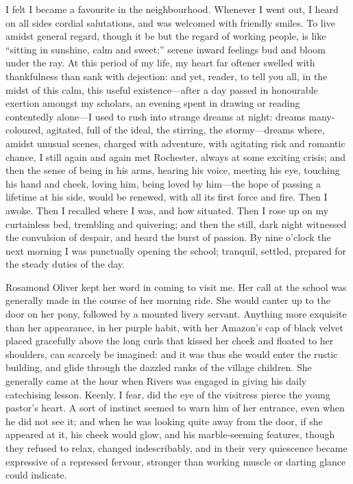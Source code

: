 I felt I became a favourite in the neighbourhood. Whenever I went out,
I heard on all sides cordial salutations, and was welcomed with friendly
smiles. To live amidst general regard, though it be but the regard of
working people, is like \enquote{sitting in sunshine, calm and sweet;}
serene inward feelings bud and bloom under the ray. At this period of
my life, my heart far oftener swelled with thankfulness than sank with
dejection: and yet, reader, to tell you all, in the midst of this calm,
this useful existence---after a day passed in honourable exertion
amongst my scholars, an evening spent in drawing or reading contentedly
alone---I used to rush into strange dreams at night: dreams
many-coloured, agitated, full of the ideal, the stirring, the
stormy---dreams where, amidst unusual scenes, charged with adventure,
with agitating risk and romantic chance, I still again and again met \Mr{}
Rochester, always at some exciting crisis; and then the sense of being
in his arms, hearing his voice, meeting his eye, touching his hand and
cheek, loving him, being loved by him---the hope of passing a lifetime
at his side, would be renewed, with all its first force and fire. Then
I awoke. Then I recalled where I was, and how situated. Then I rose up
on my curtainless bed, trembling and quivering; and then the still, dark
night witnessed the convulsion of despair, and heard the burst of
passion. By nine o'clock the next morning I was punctually opening the
school; tranquil, settled, prepared for the steady duties of the day.

Rosamond Oliver kept her word in coming to visit me. Her call at the
school was generally made in the course of her morning ride. She would
canter up to the door on her pony, followed by a mounted livery
servant. Anything more exquisite than her appearance, in her purple
habit, with her Amazon's cap of black velvet placed gracefully above the
long curls that kissed her cheek and floated to her shoulders, can
scarcely be imagined: and it was thus she would enter the rustic
building, and glide through the dazzled ranks of the village children.
She generally came at the hour when \Mr{} Rivers was engaged in giving his
daily catechising lesson. Keenly, I fear, did the eye of the visitress
pierce the young pastor's heart. A sort of instinct seemed to warn him
of her entrance, even when he did not see it; and when he was looking
quite away from the door, if she appeared at it, his cheek would glow,
and his marble-seeming features, though they refused to relax, changed
indescribably, and in their very quiescence became expressive of a
repressed fervour, stronger than working muscle or darting glance could
indicate.


